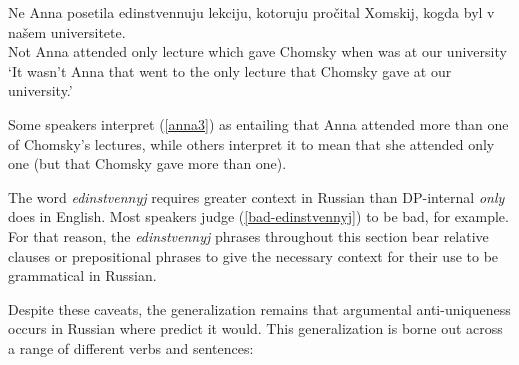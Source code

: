 \begin{exe}
	\ex \label{anna2.1} \gll Ne Anna posetila edinstvennuju lekciju, kotoruju pro\v{c}ital Xomskij, kogda byl v na\v{s}em universitete.\\
	Not Anna attended only lecture which gave Chomsky when was at our university\\
	\glt `It wasn't Anna that went to the only lecture that Chomsky gave at our university.'
\end{exe}

Some speakers interpret (\ref{anna3}) as entailing that Anna attended more than one of Chomsky's lectures, while others interpret it to mean that she attended only one (but that Chomsky gave more than one).

The word \textit{edinstvennyj} requires greater context in Russian than DP-internal \textit{only} does in English. Most speakers judge (\ref{bad-edinstvennyj}) to be bad, for example. For that reason, the \textit{edinstvennyj} phrases throughout this section bear relative clauses or prepositional phrases to give the necessary context for their use to be grammatical in Russian.

\begin{exe}
\end{exe}

Despite these caveats, the generalization remains that argumental anti-uniqueness occurs in Russian where \citeauthor{cb2015} predict it would. This generalization is borne out across a range of different verbs and sentences:

